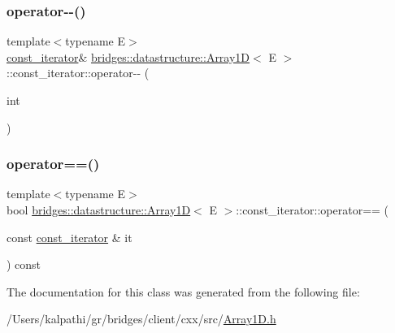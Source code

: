 \mbox{\label{classbridges_1_1datastructure_1_1_array1_d_1_1const__iterator_a815972df8b28780f88dac8133322e8ab}} 
\subsubsection{\texorpdfstring{operator-\/-\/()}{operator--()}\hspace{0.1cm}{\footnotesize\ttfamily [2/2]}}
{\footnotesize\ttfamily template$<$typename E$>$ \\
\mbox{\hyperlink{classbridges_1_1datastructure_1_1_array1_d_1_1const__iterator}{const\+\_\+iterator}}\& \mbox{\hyperlink{classbridges_1_1datastructure_1_1_array1_d}{bridges\+::datastructure\+::\+Array1D}}$<$ E $>$\+::const\+\_\+iterator\+::operator-\/-\/ (\begin{DoxyParamCaption}\item[{int}]{ }\end{DoxyParamCaption})\hspace{0.3cm}{\ttfamily [inline]}}

\mbox{\label{classbridges_1_1datastructure_1_1_array1_d_1_1const__iterator_a004eca869afdc913a1d1a448bb4b7871}} 
\subsubsection{\texorpdfstring{operator==()}{operator==()}}
{\footnotesize\ttfamily template$<$typename E$>$ \\
bool \mbox{\hyperlink{classbridges_1_1datastructure_1_1_array1_d}{bridges\+::datastructure\+::\+Array1D}}$<$ E $>$\+::const\+\_\+iterator\+::operator== (\begin{DoxyParamCaption}\item[{const \mbox{\hyperlink{classbridges_1_1datastructure_1_1_array1_d_1_1const__iterator}{const\+\_\+iterator}} \&}]{it }\end{DoxyParamCaption}) const\hspace{0.3cm}{\ttfamily [inline]}}



The documentation for this class was generated from the following file\+:\begin{DoxyCompactItemize}
\item 
/\+Users/kalpathi/gr/bridges/client/cxx/src/\mbox{\hyperlink{_array1_d_8h}{Array1\+D.\+h}}\end{DoxyCompactItemize}

